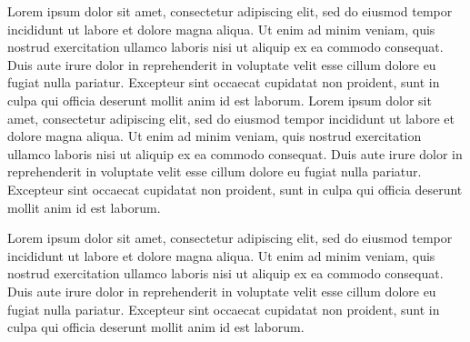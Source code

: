 Lorem ipsum dolor sit amet, consectetur adipiscing elit, sed do eiusmod tempor incididunt ut labore et dolore magna aliqua. Ut enim ad minim veniam, quis nostrud exercitation ullamco laboris nisi ut aliquip ex ea commodo consequat. Duis aute irure dolor in reprehenderit in voluptate velit esse cillum dolore eu fugiat nulla pariatur. Excepteur sint occaecat cupidatat non proident, sunt in culpa qui officia deserunt mollit anim id est laborum. Lorem ipsum dolor sit amet, consectetur adipiscing elit, sed do eiusmod tempor incididunt ut labore et dolore magna aliqua. Ut enim ad minim veniam, quis nostrud exercitation ullamco laboris nisi ut aliquip ex ea commodo consequat. Duis aute irure dolor in reprehenderit in voluptate velit esse cillum dolore eu fugiat nulla pariatur. Excepteur sint occaecat cupidatat non proident, sunt in culpa qui officia deserunt mollit anim id est laborum.

Lorem ipsum dolor sit amet, consectetur adipiscing elit, sed do eiusmod tempor incididunt ut labore et dolore magna aliqua. Ut enim ad minim veniam, quis nostrud exercitation ullamco laboris nisi ut aliquip ex ea commodo consequat. Duis aute irure dolor in reprehenderit in voluptate velit esse cillum dolore eu fugiat nulla pariatur. Excepteur sint occaecat cupidatat non proident, sunt in culpa qui officia deserunt mollit anim id est laborum.


